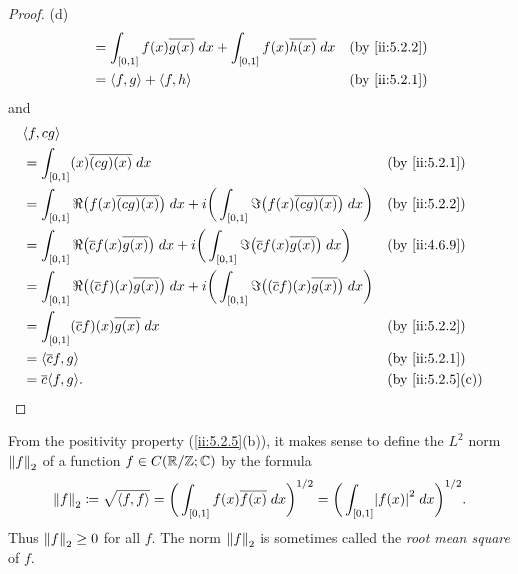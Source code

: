 \begin{proof}{(d)}
\begin{align*}
     & = \int_{[0, 1]} f(x) \overline{g(x)} \; dx + \int_{[0, 1]} f(x) \overline{h(x)} \; dx                                               &                                                      & \by{ii:5.2.2} \\
     & = \inner*{f, g} + \inner*{f, h}                                                                                                     &                                                      & \by{ii:5.2.1}
  \end{align*}
  and
  \begin{align*}
     & \inner*{f, cg}                                                                                                                                                                    \\
     & = \int_{[0, 1]} (x) \overline{(cg)(x)} \; dx                                                                                                                &  & \by{ii:5.2.1}    \\
     & = \int_{[0, 1]} \Re\big(f(x) \overline{(cg)(x)}\big) \; dx + i \bigg(\int_{[0, 1]} \Im\big(f(x) \overline{(cg)(x)}\big) \; dx\bigg)                         &  & \by{ii:5.2.2}    \\
     & = \int_{[0, 1]} \Re\big(\overline{c} f(x) \overline{g(x)}\big) \; dx + i \bigg(\int_{[0, 1]} \Im\big(\overline{c} f(x) \overline{g(x)}\big) \; dx\bigg)     &  & \by{ii:4.6.9}    \\
     & = \int_{[0, 1]} \Re\big((\overline{c} f)(x) \overline{g(x)}\big) \; dx + i \bigg(\int_{[0, 1]} \Im\big((\overline{c} f)(x) \overline{g(x)}\big) \; dx\bigg)                       \\
     & = \int_{[0, 1]} (\overline{c} f)(x) \overline{g(x)} \; dx                                                                                                   &  & \by{ii:5.2.2}    \\
     & = \inner*{\overline{c} f, g}                                                                                                                                &  & \by{ii:5.2.1}    \\
     & = \overline{c} \inner*{f, g}.                                                                                                                               &  & \by{ii:5.2.5}[c]
  \end{align*}
\end{proof}

\begin{ac}\label{ii:ac:5.2.1}
  From the positivity property (\cref{ii:5.2.5}(b)), it makes sense to define the \(L^2\) norm \(\norm*{f}_2\) of a function \(f \in C(\R / \Z ; \C)\) by the formula
  \[
    \norm*{f}_2 \coloneqq \sqrt{\inner*{f, f}} = \bigg(\int_{[0, 1]} f(x) \overline{f(x)} \; dx\bigg)^{1 / 2} = \bigg(\int_{[0, 1]} \abs{f(x)}^2 \; dx\bigg)^{1 / 2}.
  \]
  Thus \(\norm*{f}_2 \geq 0\) for all \(f\).
  The norm \(\norm*{f}_2\) is sometimes called the \emph{root mean square} of \(f\).
\end{ac}

